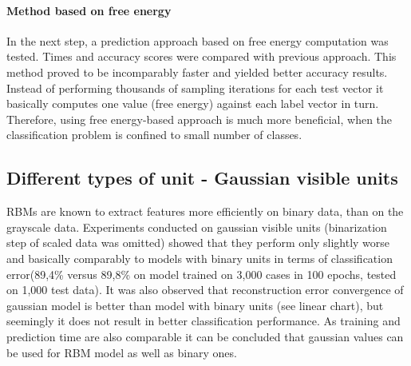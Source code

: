 \documentclass[a4paper]{scrartcl}
\begin{document}
\paragraph{Method based on free energy} In the next step, a prediction approach based on free energy computation was tested. Times and accuracy scores were compared with previous approach. This method proved to be incomparably faster and yielded better accuracy results. Instead of performing thousands of sampling iterations for each test vector it basically computes one value (free energy) against each label vector in turn. Therefore, using free energy-based approach is much more beneficial, when the classification problem is confined to small number of classes. 

\subsection{Different types of unit - Gaussian visible units}
RBMs are known to extract features more efficiently on binary data, than on the grayscale data. Experiments conducted on gaussian visible units (binarization step of scaled data was omitted) showed that they perform only slightly worse and basically comparably to models with binary units in terms of classification error(89,4\% versus 89,8\% on model trained on 3,000 cases in 100 epochs, tested on 1,000 test data). It was also observed that reconstruction error convergence of gaussian model is better than model with binary units (see linear chart), but seemingly it does not result in better classification performance. As training and prediction time are also comparable it can be concluded that gaussian values can be used for RBM model as well as binary ones. 
\end{document}
